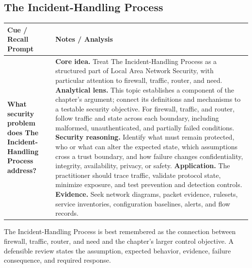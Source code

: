 \documentclass[11pt]{article}
\newcommand{\CornellHeader}{%
\rowcolor{Navy}\color{white}\bfseries Cue / Recall Prompt & \color{white}\bfseries Notes / Analysis\\\hline}
\newcommand{\CornellRow}[2]{%
\cellcolor{CueGray}\RaggedRight\textbf{#1} & \RaggedRight #2\\\hline}
\begin{document}
\subsection*{The Incident-Handling Process}
\begin{longtable}{>{\RaggedRight\arraybackslash}p{}|>{\RaggedRight\arraybackslash}p{}}
\CornellHeader
\CornellRow{What security problem does The Incident-Handling Process address?}{\textbf{Core idea.} Treat The Incident-Handling Process as a structured part of Local Area Network Security, with particular attention to firewall, traffic, router, and need. \textbf{Analytical lens.} This topic establishes a component of the chapter's argument; connect its definitions and mechanisms to a testable security objective. For firewall, traffic, and router, follow traffic and state across each boundary, including malformed, unauthenticated, and partially failed conditions. \textbf{Security reasoning.} Identify what must remain protected, who or what can alter the expected state, which assumptions cross a trust boundary, and how failure changes confidentiality, integrity, availability, privacy, or safety. \textbf{Application.} The practitioner should trace traffic, validate protocol state, minimize exposure, and test prevention and detection controls. \textbf{Evidence.} Seek network diagrams, packet evidence, rulesets, service inventories, configuration baselines, alerts, and flow records.}
\end{longtable}
\begin{topicsummary}
The Incident-Handling Process is best remembered as the connection between firewall, traffic, router, and need and the chapter's larger control objective. A defensible review states the assumption, expected behavior, evidence, failure consequence, and required response.
\end{topicsummary}
\end{document}
